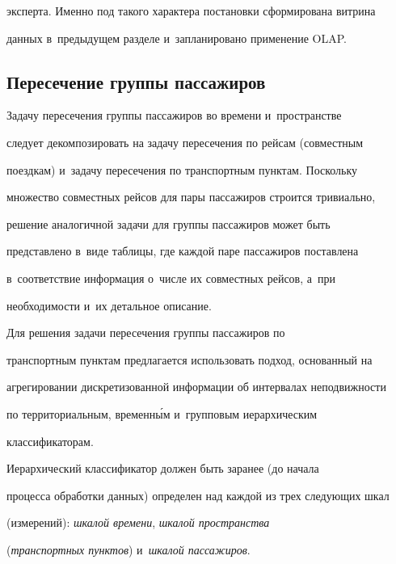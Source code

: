 эксперта. Именно под такого характера постановки сформирована витрина 


данных в~предыдущем разделе и~запланировано применение OLAP.


      


\subsection{Пересечение группы пассажиров}





      Задачу пересечения группы пассажиров во времени и~пространстве 


следует декомпозировать на задачу пересечения по рейсам (совместным 


поездкам) и~задачу пересечения по транспортным пунктам. Поскольку 


множество совместных рейсов для пары пассажиров строится тривиально, 


решение аналогичной задачи для группы пассажиров может быть 


представлено в~виде таблицы, где каждой паре пассажиров поставлена 


в~соответствие информация о~числе их совместных рейсов, а~при 


необходимости и~их детальное описание.


      


      Для решения задачи пересечения группы пассажиров по 


транспортным пунктам предлагается использовать подход, основанный на 


агрегировании дискретизованной информации об интервалах неподвижности 


по территориальным, временн\'{ы}м и~групповым иерархическим 


классификаторам.


      


      Иерархический классификатор должен быть заранее (до начала 


процесса обработки данных) определен над каждой из трех следующих шкал 


(измерений): \textit{шкалой времени}, \textit{шкалой пространства} 


(\textit{транспортных пунктов}) и~\textit{шкалой пассажиров}.






